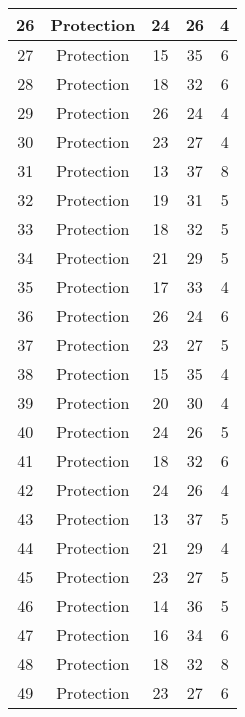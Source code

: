 \documentclass[results.tex]{subfiles}
\begin{document}
\begin{center}
\begin{tabular}{| c || c | c | c | c |}
    \hline
    26 & Protection & 24 & 26 & 4 \\ 
    \hline
    27 & Protection & 15 & 35 & 6 \\ 
    \hline
    28 & Protection & 18 & 32 & 6 \\ 
    \hline
    29 & Protection & 26 & 24 & 4 \\ 
    \hline
    30 & Protection & 23 & 27 & 4 \\ 
    \hline
    31 & Protection & 13 & 37 & 8 \\ 
    \hline
    32 & Protection & 19 & 31 & 5 \\ 
    \hline
    33 & Protection & 18 & 32 & 5 \\ 
    \hline
    34 & Protection & 21 & 29 & 5 \\ 
    \hline
    35 & Protection & 17 & 33 & 4 \\ 
    \hline
    36 & Protection & 26 & 24 & 6 \\ 
    \hline
    37 & Protection & 23 & 27 & 5 \\ 
    \hline
    38 & Protection & 15 & 35 & 4 \\ 
    \hline
    39 & Protection & 20 & 30 & 4 \\ 
    \hline
    40 & Protection & 24 & 26 & 5 \\ 
    \hline
    41 & Protection & 18 & 32 & 6 \\ 
    \hline
    42 & Protection & 24 & 26 & 4 \\ 
    \hline
    43 & Protection & 13 & 37 & 5 \\ 
    \hline
    44 & Protection & 21 & 29 & 4 \\ 
    \hline
    45 & Protection & 23 & 27 & 5 \\ 
    \hline
    46 & Protection & 14 & 36 & 5 \\ 
    \hline
    47 & Protection & 16 & 34 & 6 \\ 
    \hline
    48 & Protection & 18 & 32 & 8 \\ 
    \hline
    49 & Protection & 23 & 27 & 6 \\ 
    \hline   \end{tabular}
\end{center}
\end{document}
